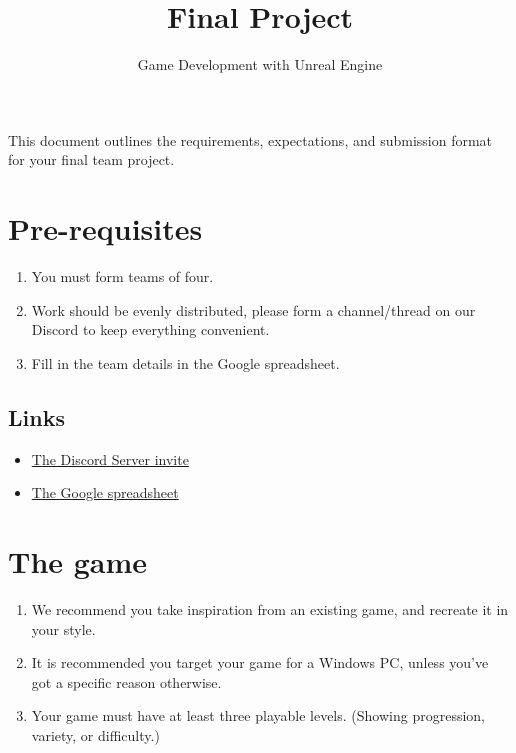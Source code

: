\documentclass{article}
\title{Final Project}
\author{Game Development with Unreal Engine}
\date{}
\begin{document}
\maketitle

This document outlines the requirements, expectations, and submission format for your final team project.

\section{Pre-requisites}
\begin{enumerate}
    \item You must form teams of four.
    \item Work should be evenly distributed, please form a channel/thread on our Discord to keep everything convenient.
    \item Fill in the team details in the Google spreadsheet.
\end{enumerate}
\subsection{Links}
\begin{itemize}
\item \href{https://discord.gg/muZEEAHsg6}{The Discord Server invite}
\item \href{https://docs.google.com/spreadsheets/d/1uJ7tC7BC8lP6ygwYjTOuPb64RGZ_CsXMxxr8spKwdto/edit?usp=sharing}{The Google spreadsheet}
\end{itemize}

\section{The game}
\begin{enumerate}
    \item We recommend you take inspiration from an existing game, and recreate it in your style.
    \item It is recommended you target your game for a Windows PC, unless you've got a specific reason otherwise.
    \item Your game must have at least three playable levels. (Showing progression, variety, or difficulty.)
\end{enumerate}
\end{document}
